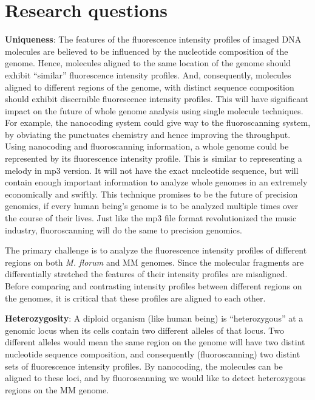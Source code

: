 \section{Research questions}
{\bf{Uniqueness}}: The features of the fluorescence intensity profiles of imaged DNA molecules are believed to be influenced by the nucleotide composition of the genome. Hence, molecules aligned to the same location of the genome should exhibit ``similar'' fluorescence intensity profiles. And, consequently, molecules aligned to different regions of the genome, with distinct sequence composition should exhibit discernible fluorescence intensity profiles. This will have significant impact on the future of whole genome analysis using single molecule techniques. For example, the nanocoding system could give way to the fluoroscanning system, by obviating the punctuates chemistry and hence improving the throughput. Using nanocoding and fluoroscanning information, a whole genome could be represented by its fluorescence intensity profile. This is similar to representing a melody in mp3 version. It will not have the exact nucleotide sequence, but will contain enough important information to analyze whole genomes in an extremely economically and swiftly. This technique promises to be the future of precision genomics, if every human being's genome is to be analyzed multiple times over the course of their lives. Just like the mp3 file format revolutionized the music industry, fluoroscanning will do the same to precision genomics. 

\begin{tcolorbox}[colback=green!5,colframe=green!40!black,title=Statistical challenge] %
The primary challenge is to analyze the fluorescence intensity profiles of different regions on both {\emph{M. florum}} and MM genomes. Since the molecular fragments are differentially stretched the features of their intensity profiles are misaligned. Before comparing and contrasting intensity profiles between different regions on the genomes, it is critical that these profiles are aligned to each other. 
\end{tcolorbox}

{\bf{Heterozygosity}}: A diploid organism (like human being) is ``heterozygous'' at a genomic locus when its cells contain two different alleles of that locus. Two different alleles would mean the same region on the genome will have two distint nucleotide sequence composition, and consequently (fluoroscanning) two distint sets of fluorescence intensity profiles. By nanocoding, the molecules can be aligned to these loci, and by fluoroscanning we would like to detect heterozygous regions on the MM genome. 

